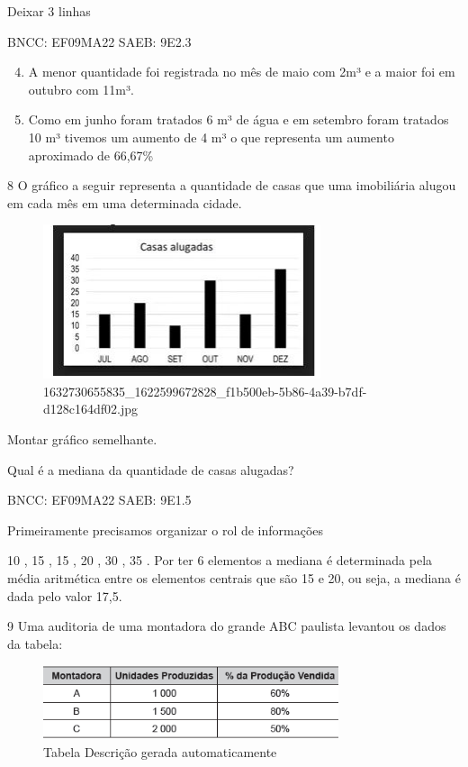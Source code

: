 \begin{escolha}
{{{\begin{escolha}
{{{{{\begin{escolha}
\begin{escolha}
{\begin{q°}
Deixar 3 linhas

BNCC: EF09MA22 SAEB: 9E2.3

\begin{enumerate}

\setcounter{enumi}{3}
\item
  A menor quantidade foi registrada no mês de maio com 2m³ e a maior foi
  em outubro com 11m³.
\item
  Como em junho foram tratados 6 m³ de água e em setembro foram tratados
  10 m³ tivemos um aumento de 4 m³ o que representa um aumento
  aproximado de 66,67\%
\end{enumerate}

\num{8} O gráfico a seguir representa a quantidade de casas que uma
imobiliária alugou em cada mês em uma determinada cidade.

\begin{figure}
\centering
\includegraphics[width=3.21165in,height=1.77953in]{./_SAEB_9_MAT/media/image217.jpg}
\caption{1632730655835\_1622599672828\_f1b500eb-5b86-4a39-b7df-d128c164df02.jpg}
\end{figure}

Montar gráfico semelhante.

Qual é a mediana da quantidade de casas alugadas?

BNCC: EF09MA22 SAEB: 9E1.5

Primeiramente precisamos organizar o rol de informações

10 , 15 , 15 , 20 , 30 , 35 . Por ter 6 elementos a mediana é
determinada pela média aritmética entre os elementos centrais que são 15
e 20, ou seja, a mediana é dada pelo valor 17,5.

\num{9} Uma auditoria de uma montadora do grande ABC paulista levantou os
dados da tabela:

\begin{figure}
\centering
\includegraphics[width=3.41667in,height=0.85417in]{./_SAEB_9_MAT/media/image218.png}
\caption{Tabela Descrição gerada automaticamente}
\end{figure}


\end{q°}}
\end{escolha}
\end{escolha}}}}}}
\end{escolha}}}}
\end{escolha}
